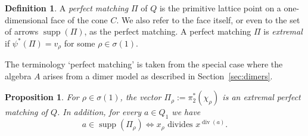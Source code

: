 \documentclass[11pt,a4paper]{amsart}
\numberwithin{equation}{section}
\newtheorem{proposition}[theorem]{Proposition}
\theoremstyle{definition}
\newtheorem{definition}[theorem]{Definition}
\theoremstyle{remark}
\renewcommand{\div}{\operatorname{div}}
\newcommand{\supp}{\operatorname{supp}}
\begin{document}
\begin{definition}
\label{def:perfectmatching}
A \emph{perfect matching} $\Pi$ of $Q$ is the primitive lattice point on a one-dimensional face of the cone $C$. We also refer to the face itself, or even to the set of arrows $\supp(\Pi)$, as the perfect matching. A perfect matching $\Pi$ is \emph{extremal} if $\psi^*(\Pi) = v_\rho$ for some $\rho\in \sigma(1)$.
\end{definition}

The terminology `perfect matching' is taken from the special case where the algebra $A$ arises from a dimer model as described in Section~\ref{sec:dimers}.

 \begin{proposition}
 \label{prop:perfmatchlabels}
 For $\rho\in \sigma(1)$,  the vector $\Pi_\rho:= \pi_2^*(\chi_\rho)$ is an extremal perfect matching of $Q$. In addition, for every $a\in Q_1$ we have
 \begin{equation}
 \label{eqn:supportlabels}
 a\in \supp(\Pi_\rho)\iff x_\rho \text{ divides }x^{\div(a)}.
 \end{equation}
  \end{proposition}
\end{document}
